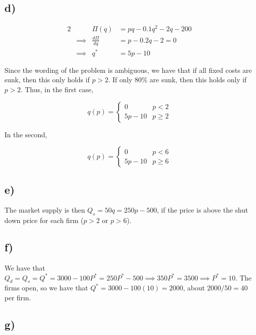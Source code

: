 \documentclass[12pt,letterpaper]{article}
\theoremstyle{definition}
\begin{document}
\subsection*{d)}

\begin{alignat*}{2}
  && \Pi(q) &= pq - 0.1q^2 - 2q - 200 \\
  &\implies& \frac{d\Pi}{dq} &= p - 0.2q - 2 = 0\\
  &\implies& q^* &= 5p - 10
\end{alignat*}

Since the wording of the problem is ambiguous, we have that if all fixed costs
are sunk, then this only holds if $p > 2$. If only $80\%$ are sunk, then this
holds only if $p > 2$. Thus, in the first case,

\[
  q(p) = \begin{cases}
    0 & p < 2 \\
    5p - 10 & p \geq 2
  \end{cases}
\]

In the second,

\[
  q(p) = \begin{cases}
    0 & p < 6 \\
    5p - 10 & p \geq 6
  \end{cases}
\]
\subsection*{e)}

The market supply is then $Q_s = 50q = 250p - 500$, if the price is above the
shut down price for each firm ($p > 2$ or $p > 6$).

\subsection*{f)}

We have that $Q_d = Q_s = Q^* = 3000-100P^* = 250P^* - 500 \implies 350P^* =
3500 \implies P^* = 10$. The firms open, so we have that $Q^* = 3000 - 100(10)
= 2000$, about $2000/50 = 40$ per firm.

\subsection*{g)}
\end{document}
